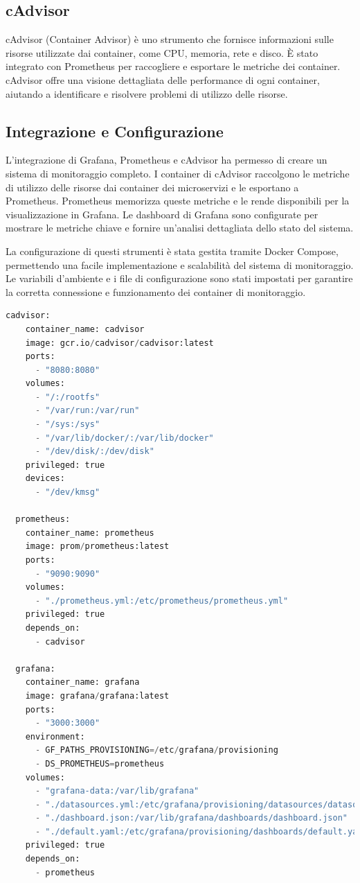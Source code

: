 \subsection{cAdvisor}

cAdvisor (Container Advisor) è uno strumento che fornisce informazioni sulle risorse utilizzate dai container, come CPU, memoria, rete e disco. È stato integrato con Prometheus per raccogliere e esportare le metriche dei container. cAdvisor offre una visione dettagliata delle performance di ogni container, aiutando a identificare e risolvere problemi di utilizzo delle risorse.

\subsection{Integrazione e Configurazione}

L'integrazione di Grafana, Prometheus e cAdvisor ha permesso di creare un sistema di monitoraggio completo. I container di cAdvisor raccolgono le metriche di utilizzo delle risorse dai container dei microservizi e le esportano a Prometheus. Prometheus memorizza queste metriche e le rende disponibili per la visualizzazione in Grafana. Le dashboard di Grafana sono configurate per mostrare le metriche chiave e fornire un'analisi dettagliata dello stato del sistema.

La configurazione di questi strumenti è stata gestita tramite Docker Compose, permettendo una facile implementazione e scalabilità del sistema di monitoraggio. Le variabili d'ambiente e i file di configurazione sono stati impostati per garantire la corretta connessione e funzionamento dei container di monitoraggio.

\begin{lstlisting}[language=Python, caption={Esempio di configurazione Docker Compose}, label=list:docker_compose_monitoring]
 cadvisor:
    container_name: cadvisor
    image: gcr.io/cadvisor/cadvisor:latest
    ports:
      - "8080:8080"
    volumes:
      - "/:/rootfs"
      - "/var/run:/var/run"
      - "/sys:/sys"
      - "/var/lib/docker/:/var/lib/docker"
      - "/dev/disk/:/dev/disk"
    privileged: true
    devices:
      - "/dev/kmsg"

  prometheus:
    container_name: prometheus
    image: prom/prometheus:latest
    ports:
      - "9090:9090"
    volumes:
      - "./prometheus.yml:/etc/prometheus/prometheus.yml"
    privileged: true
    depends_on:
      - cadvisor

  grafana:
    container_name: grafana
    image: grafana/grafana:latest
    ports:
      - "3000:3000"
    environment:
      - GF_PATHS_PROVISIONING=/etc/grafana/provisioning
      - DS_PROMETHEUS=prometheus
    volumes:
      - "grafana-data:/var/lib/grafana"
      - "./datasources.yml:/etc/grafana/provisioning/datasources/datasources.yml"
      - "./dashboard.json:/var/lib/grafana/dashboards/dashboard.json"
      - "./default.yaml:/etc/grafana/provisioning/dashboards/default.yaml"
    privileged: true
    depends_on:
      - prometheus
\end{lstlisting}

